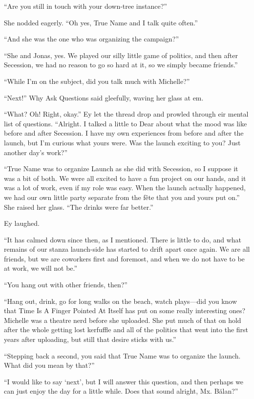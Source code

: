 ``Are you still in touch with your down-tree instance?''

She nodded eagerly. ``Oh yes, True Name and I talk quite often.''

``And she was the one who was organizing the campaign?''

``She and Jonas, yes. We played our silly little game of politics, and then after Secession, we had no reason to go so hard at it, so we simply became friends.''

``While I'm on the subject, did you talk much with Michelle?''

``Next!'' Why Ask Questions said gleefully, waving her glass at em.

``What? Oh! Right, okay.'' Ey let the thread drop and prowled through eir mental list of questions. ``Alright. I talked a little to Dear about what the mood was like before and after Secession. I have my own experiences from before and after the launch, but I'm curious what yours were. Was the launch exciting to you? Just another day's work?''

``True Name was to organize Launch as she did with Secession, so I suppose it was a bit of both. We were all excited to have a fun project on our hands, and it was a lot of work, even if my role was easy. When the launch actually happened, we had our own little party separate from the fête that you and yours put on.'' She raised her glass. ``The drinks were far better.''

Ey laughed.

``It has calmed down since then, as I mentioned. There is little to do, and what remains of our stanza launch-side has started to drift apart once again. We are all friends, but we are coworkers first and foremost, and when we do not have to be at work, we will not be.''

``You hang out with other friends, then?''

``Hang out, drink, go for long walks on the beach, watch plays---did you know that Time Is A Finger Pointed At Itself has put on some really interesting ones? Michelle was a theatre nerd before she uploaded. She put much of that on hold after the whole getting lost kerfuffle and all of the politics that went into the first years after uploading, but still that desire sticks with us.''

``Stepping back a second, you said that True Name was to organize the launch. What did you mean by that?''

``I would like to say `next', but I will answer this question, and then perhaps we can just enjoy the day for a little while. Does that sound alright, Mx. Bălan?''

